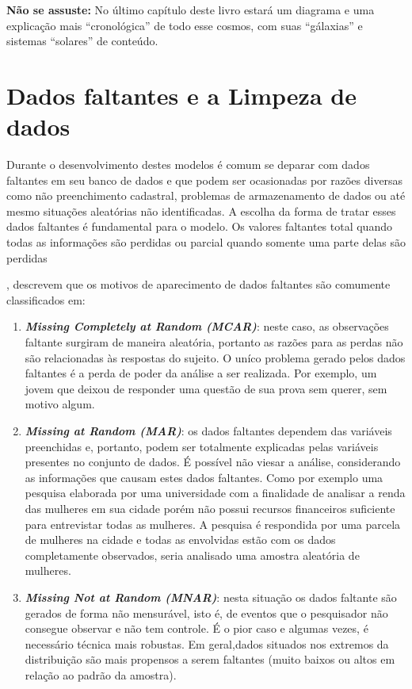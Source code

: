\documentclass[
]{book}
\begin{document}
\textbf{Não se assuste:} No último capítulo deste livro estará um diagrama e uma explicação mais ``cronológica'' de todo esse cosmos, com suas ``gálaxias'' e sistemas ``solares'' de conteúdo.

\hypertarget{dados-faltantes-e-a-limpeza-de-dados}{%
\section{Dados faltantes e a Limpeza de dados}\label{dados-faltantes-e-a-limpeza-de-dados}}

Durante o desenvolvimento destes modelos é comum se deparar com dados faltantes em seu banco de dados e que podem ser ocasionadas por razões diversas como não preenchimento cadastral, problemas de armazenamento de dados ou até mesmo situações aleatórias não identificadas. A escolha da forma de tratar esses dados faltantes é fundamental para o modelo. Os valores faltantes total quando todas as informações são perdidas ou parcial quando somente uma parte delas são perdidas

\citep{little2019statistical}, descrevem que os motivos de aparecimento de dados faltantes são comumente classificados em:

\begin{enumerate}
\def\labelenumi{\arabic{enumi}.}
\item
  \textbf{\emph{Missing Completely at Random (MCAR)}}: neste caso, as observações faltante surgiram de maneira aleatória, portanto as razões para as perdas não são relacionadas às respostas do sujeito. O uníco problema gerado pelos dados faltantes é a perda de poder da análise a ser realizada. Por exemplo, um jovem que deixou de responder uma questão de sua prova sem querer, sem motivo algum.
\item
  \textbf{\emph{Missing at Random (MAR)}}: os dados faltantes dependem das variáveis preenchidas e, portanto, podem ser totalmente explicadas pelas variáveis presentes no conjunto de dados. É possível não viesar a análise, considerando as informações que causam estes dados faltantes. Como por exemplo uma pesquisa elaborada por uma universidade com a finalidade de analisar a renda das mulheres em sua cidade porém não possui recursos financeiros suficiente para entrevistar todas as mulheres. A pesquisa é respondida por uma parcela de mulheres na cidade e todas as envolvidas estão com os dados completamente observados, seria analisado uma amostra aleatória de mulheres.
\item
  \textbf{\emph{Missing Not at Random (MNAR)}}: nesta situação os dados faltante são gerados de forma não mensurável, isto é, de eventos que o pesquisador não consegue observar e não tem controle. É o pior caso e algumas vezes, é necessário técnica mais robustas. Em geral,dados situados nos extremos da distribuição são mais propensos a serem faltantes (muito baixos ou altos em relação ao padrão da amostra).
\end{enumerate}
\end{document}
